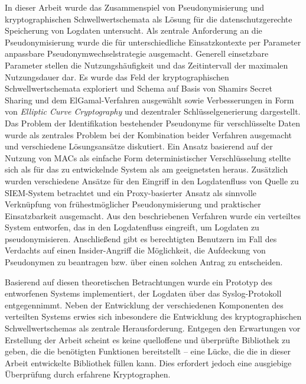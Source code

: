 In dieser Arbeit wurde das Zusammenspiel von Pseudonymisierung und kryptographischen Schwellwertschemata als Lösung für die datenschutzgerechte Speicherung von Logdaten untersucht. 
Als zentrale Anforderung an die Pseudonymisierung wurde die für unterschiedliche Einsatzkontexte per Parameter anpassbare Pseudonymwechselstrategie ausgemacht. Generell einsetzbare Parameter stellen die Nutzungshäufigkeit und das Zeitintervall der maximalen Nutzungsdauer dar. 
Es wurde das Feld der kryptographischen Schwellwertschemata exploriert und Schema auf Basis von Shamirs Secret Sharing und dem ElGamal-Verfahren ausgewählt sowie Verbesserungen in Form von \textit{Elliptic Curve Cryptography} und dezentraler Schlüsselgenerierung dargestellt.
Das Problem der Identifikation bestehender Pseudonyme für verschlüsselte Daten wurde als zentrales Problem bei der Kombination beider Verfahren ausgemacht und verschiedene Lösungsansätze diskutiert. Ein Ansatz basierend auf der Nutzung von MACs als einfache Form deterministischer Verschlüsselung stellte sich als für das zu entwickelnde System als am geeignetsten heraus.
Zusätzlich wurden verschiedene Ansätze für den Eingriff in den Logdatenfluss von Quelle zu SIEM-System betrachtet und ein Proxy-basierter Ansatz als sinnvolle Verknüpfung von frühestmöglicher Pseudonymisierung und praktischer Einsatzbarkeit ausgemacht.
Aus den beschriebenen Verfahren wurde ein verteiltes System entworfen, das in den Logdatenfluss eingreift, um Logdaten zu pseudonymisieren. Anschließend gibt es berechtigten Benutzern im Fall des Verdachts auf einen Insider-Angriff die Möglichkeit, die Aufdeckung von Pseudonymen zu beantragen bzw. über einen solchen Antrag zu entscheiden.

Basierend auf diesen theoretischen Betrachtungen wurde ein Prototyp des entworfenen Systems implementiert, der Logdaten über das Syslog-Protokoll entgegennimmt. Neben der Entwicklung der verschiedenen Komponenten des verteilten Systems erwies sich inbesondere die Entwicklung des kryptographischen Schwellwertschemas als zentrale Herausforderung. Entgegen den Erwartungen vor Erstellung der Arbeit scheint es keine quelloffene und überprüfte Bibliothek zu geben, die die benötigten Funktionen bereitstellt -- eine Lücke, die die in dieser Arbeit entwickelte Bibliothek füllen kann. Dies erfordert jedoch eine ausgiebige Überprüfung durch erfahrene Kryptographen.

